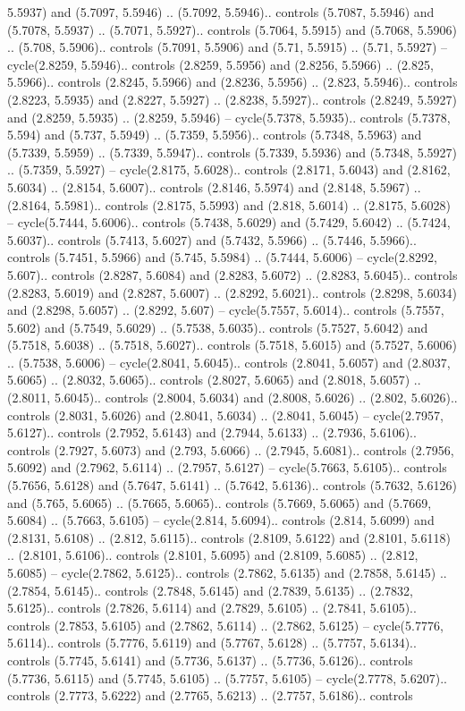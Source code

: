 5.5937) and (5.7097, 5.5946) .. (5.7092, 5.5946).. controls (5.7087, 5.5946) and (5.7078, 5.5937) .. (5.7071, 5.5927).. controls (5.7064, 5.5915) and (5.7068, 5.5906) .. (5.708, 5.5906).. controls (5.7091, 5.5906) and (5.71, 5.5915) .. (5.71, 5.5927) -- cycle(2.8259, 5.5946).. controls (2.8259, 5.5956) and (2.8256, 5.5966) .. (2.825, 5.5966).. controls (2.8245, 5.5966) and (2.8236, 5.5956) .. (2.823, 5.5946).. controls (2.8223, 5.5935) and (2.8227, 5.5927) .. (2.8238, 5.5927).. controls (2.8249, 5.5927) and (2.8259, 5.5935) .. (2.8259, 5.5946) -- cycle(5.7378, 5.5935).. controls (5.7378, 5.594) and (5.737, 5.5949) .. (5.7359, 5.5956).. controls (5.7348, 5.5963) and (5.7339, 5.5959) .. (5.7339, 5.5947).. controls (5.7339, 5.5936) and (5.7348, 5.5927) .. (5.7359, 5.5927) -- cycle(2.8175, 5.6028).. controls (2.8171, 5.6043) and (2.8162, 5.6034) .. (2.8154, 5.6007).. controls (2.8146, 5.5974) and (2.8148, 5.5967) .. (2.8164, 5.5981).. controls (2.8175, 5.5993) and (2.818, 5.6014) .. (2.8175, 5.6028) -- cycle(5.7444, 5.6006).. controls (5.7438, 5.6029) and (5.7429, 5.6042) .. (5.7424, 5.6037).. controls (5.7413, 5.6027) and (5.7432, 5.5966) .. (5.7446, 5.5966).. controls (5.7451, 5.5966) and (5.745, 5.5984) .. (5.7444, 5.6006) -- cycle(2.8292, 5.607).. controls (2.8287, 5.6084) and (2.8283, 5.6072) .. (2.8283, 5.6045).. controls (2.8283, 5.6019) and (2.8287, 5.6007) .. (2.8292, 5.6021).. controls (2.8298, 5.6034) and (2.8298, 5.6057) .. (2.8292, 5.607) -- cycle(5.7557, 5.6014).. controls (5.7557, 5.602) and (5.7549, 5.6029) .. (5.7538, 5.6035).. controls (5.7527, 5.6042) and (5.7518, 5.6038) .. (5.7518, 5.6027).. controls (5.7518, 5.6015) and (5.7527, 5.6006) .. (5.7538, 5.6006) -- cycle(2.8041, 5.6045).. controls (2.8041, 5.6057) and (2.8037, 5.6065) .. (2.8032, 5.6065).. controls (2.8027, 5.6065) and (2.8018, 5.6057) .. (2.8011, 5.6045).. controls (2.8004, 5.6034) and (2.8008, 5.6026) .. (2.802, 5.6026).. controls (2.8031, 5.6026) and (2.8041, 5.6034) .. (2.8041, 5.6045) -- cycle(2.7957, 5.6127).. controls (2.7952, 5.6143) and (2.7944, 5.6133) .. (2.7936, 5.6106).. controls (2.7927, 5.6073) and (2.793, 5.6066) .. (2.7945, 5.6081).. controls (2.7956, 5.6092) and (2.7962, 5.6114) .. (2.7957, 5.6127) -- cycle(5.7663, 5.6105).. controls (5.7656, 5.6128) and (5.7647, 5.6141) .. (5.7642, 5.6136).. controls (5.7632, 5.6126) and (5.765, 5.6065) .. (5.7665, 5.6065).. controls (5.7669, 5.6065) and (5.7669, 5.6084) .. (5.7663, 5.6105) -- cycle(2.814, 5.6094).. controls (2.814, 5.6099) and (2.8131, 5.6108) .. (2.812, 5.6115).. controls (2.8109, 5.6122) and (2.8101, 5.6118) .. (2.8101, 5.6106).. controls (2.8101, 5.6095) and (2.8109, 5.6085) .. (2.812, 5.6085) -- cycle(2.7862, 5.6125).. controls (2.7862, 5.6135) and (2.7858, 5.6145) .. (2.7854, 5.6145).. controls (2.7848, 5.6145) and (2.7839, 5.6135) .. (2.7832, 5.6125).. controls (2.7826, 5.6114) and (2.7829, 5.6105) .. (2.7841, 5.6105).. controls (2.7853, 5.6105) and (2.7862, 5.6114) .. (2.7862, 5.6125) -- cycle(5.7776, 5.6114).. controls (5.7776, 5.6119) and (5.7767, 5.6128) .. (5.7757, 5.6134).. controls (5.7745, 5.6141) and (5.7736, 5.6137) .. (5.7736, 5.6126).. controls (5.7736, 5.6115) and (5.7745, 5.6105) .. (5.7757, 5.6105) -- cycle(2.7778, 5.6207).. controls (2.7773, 5.6222) and (2.7765, 5.6213) .. (2.7757, 5.6186).. controls 